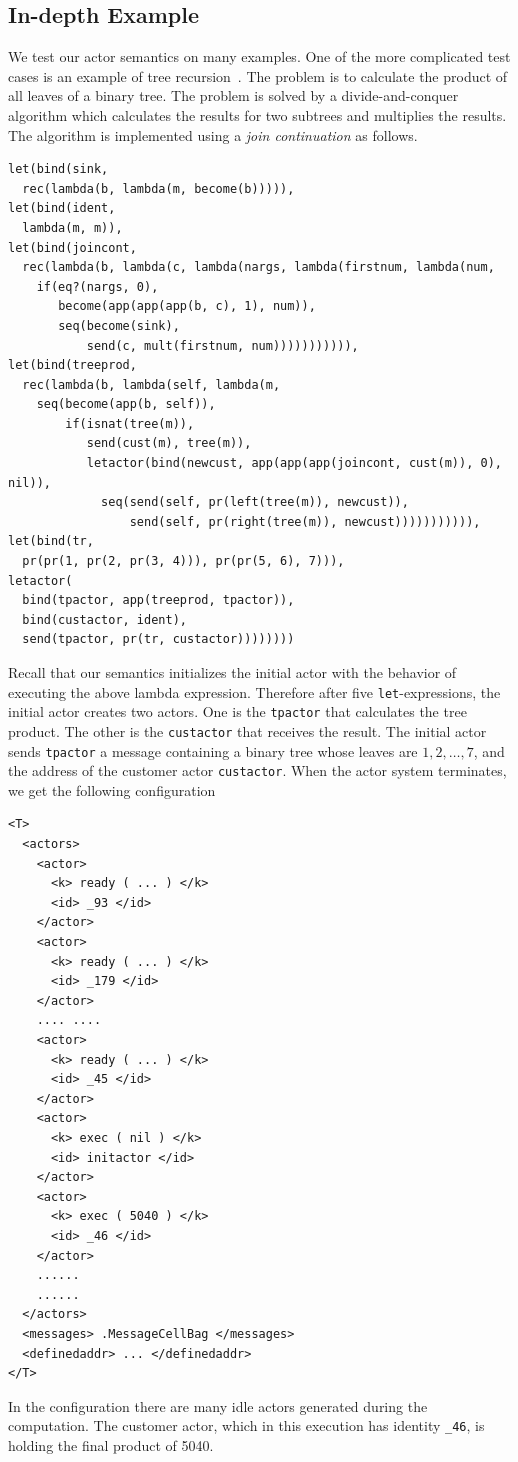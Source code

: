 \documentclass{llncs}
\begin{document}
\subsection{In-depth Example}
We test our actor semantics on many examples. One of the more complicated test
cases is an example of tree recursion~\cite{actor}.  The problem is to calculate
the product of all leaves of a binary tree.  The problem is solved by a
divide-and-conquer algorithm which calculates the results for two subtrees and
multiplies the results.  The algorithm is implemented using a
\emph{join continuation} as follows.
\small
\begin{verbatim}
let(bind(sink,
  rec(lambda(b, lambda(m, become(b))))),
let(bind(ident,
  lambda(m, m)),
let(bind(joincont,
  rec(lambda(b, lambda(c, lambda(nargs, lambda(firstnum, lambda(num,
    if(eq?(nargs, 0),
       become(app(app(app(b, c), 1), num)),
       seq(become(sink),
           send(c, mult(firstnum, num))))))))))),
let(bind(treeprod,
  rec(lambda(b, lambda(self, lambda(m,
    seq(become(app(b, self)),
        if(isnat(tree(m)),
           send(cust(m), tree(m)),
           letactor(bind(newcust, app(app(app(joincont, cust(m)), 0), nil)),
             seq(send(self, pr(left(tree(m)), newcust)),
                 send(self, pr(right(tree(m)), newcust))))))))))),
let(bind(tr, 
  pr(pr(1, pr(2, pr(3, 4))), pr(pr(5, 6), 7))),
letactor(
  bind(tpactor, app(treeprod, tpactor)),
  bind(custactor, ident),
  send(tpactor, pr(tr, custactor))))))))
\end{verbatim}
\normalsize
Recall that our semantics initializes the initial actor with the behavior of
executing the above lambda expression.
Therefore after five \texttt{let}-expressions, the initial actor creates two 
actors. One is the \texttt{tpactor} that calculates the tree product.
The other is the \texttt{custactor} that receives the result.
The initial actor sends \texttt{tpactor} a message containing a binary tree 
whose leaves are $1, 2, \dots, 7$, and the address of the customer actor 
\texttt{custactor}.
When the actor system terminates, we get the following configuration
\begin{verbatim}
<T>
  <actors>
    <actor>
      <k> ready ( ... ) </k>
      <id> _93 </id>
    </actor>
    <actor>
      <k> ready ( ... ) </k>
      <id> _179 </id>
    </actor>
    .... ....
    <actor>
      <k> ready ( ... ) </k>
      <id> _45 </id>
    </actor>
    <actor>
      <k> exec ( nil ) </k>
      <id> initactor </id>
    </actor>
    <actor>
      <k> exec ( 5040 ) </k>
      <id> _46 </id>
    </actor>
    ......
    ......
  </actors>
  <messages> .MessageCellBag </messages>
  <definedaddr> ... </definedaddr>
</T>
\end{verbatim}
In the configuration there are many idle actors generated during the 
computation. The customer actor, which in this execution has identity 
\texttt{\_46}, is holding the final product of 5040.
\end{document}

